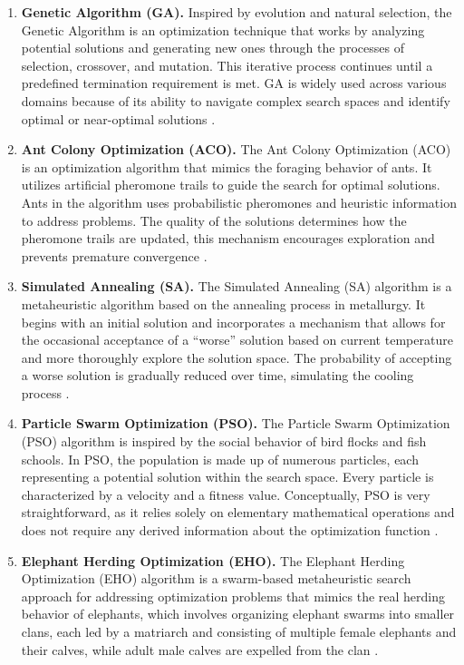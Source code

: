 \begin{enumerate}
	
\item \textbf{Genetic Algorithm (GA).} Inspired by evolution and natural selection, the Genetic Algorithm is an optimization technique that works by analyzing potential solutions and generating new ones through the processes of selection, crossover, and mutation. This iterative process continues until a predefined termination requirement is met. GA is widely used across various domains because of its ability to navigate complex search spaces and identify optimal or near-optimal solutions \parencite{Hossain2024}.

\item \textbf{Ant Colony Optimization (ACO).} The Ant Colony Optimization (ACO) is an optimization algorithm that mimics the foraging behavior of ants. It utilizes artificial pheromone trails to guide the search for optimal solutions. Ants in the algorithm uses probabilistic pheromones and heuristic information to address problems. The quality of the solutions determines how the pheromone trails are updated, this mechanism encourages exploration and prevents premature convergence \parencite{Hossain2024}.

\item \textbf{Simulated Annealing (SA).} The Simulated Annealing (SA) algorithm is a metaheuristic algorithm based on the annealing process in metallurgy. It begins with an initial solution and incorporates a mechanism that allows for the occasional acceptance of a ``worse'' solution based on current temperature and more thoroughly explore the solution space. The probability of accepting a worse solution is gradually reduced over time, simulating the cooling process \parencite{Hossain2024}.

\item \textbf{Particle Swarm Optimization (PSO).} The Particle Swarm Optimization (PSO) algorithm is inspired by the social behavior of bird flocks and fish schools. In PSO, the population is made up of numerous particles, each representing a potential solution within the search space. Every particle is characterized by a velocity and a fitness value. Conceptually, PSO is very straightforward, as it relies solely on elementary mathematical operations and does not require any derived information about the optimization function \parencite{Wadi2025}.

\item \textbf{Elephant Herding Optimization (EHO).} The Elephant Herding Optimization (EHO) algorithm is a swarm-based metaheuristic search approach for addressing optimization problems that mimics the real herding behavior of elephants, which involves organizing elephant swarms into smaller clans, each led by a matriarch and consisting of multiple female elephants and their calves, while adult male calves are expelled from the clan \parencite{Wadi2025}.


\end{enumerate}
